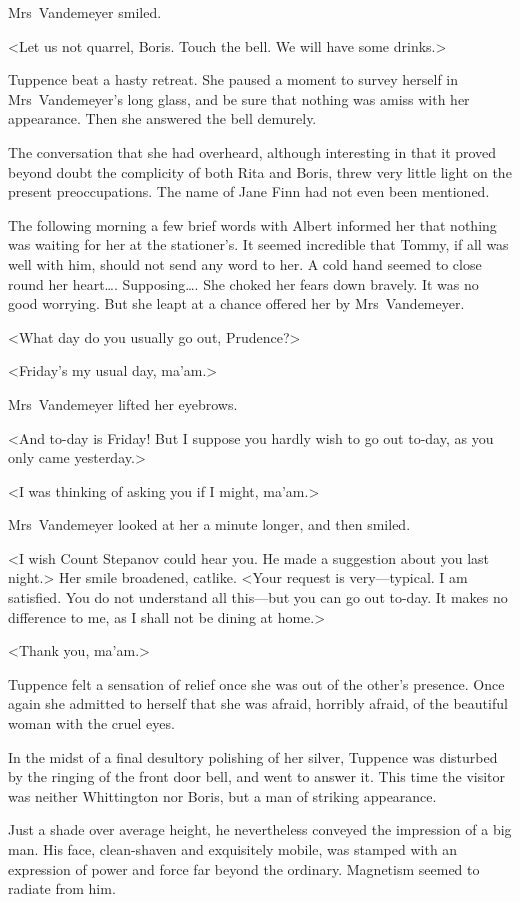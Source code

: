Mrs~Vandemeyer smiled.

<Let us not quarrel, Boris. Touch the bell. We will have some drinks.>

Tuppence beat a hasty retreat. She paused a moment to survey herself in Mrs~Vandemeyer's long glass, and be sure that nothing was amiss with her appearance. Then she answered the bell demurely.

The conversation that she had overheard, although interesting in that it proved beyond doubt the complicity of both Rita and Boris, threw very little light on the present preoccupations. The name of Jane Finn had not even been mentioned.

The following morning a few brief words with Albert informed her that nothing was waiting for her at the stationer's. It seemed incredible that Tommy, if all was well with him, should not send any word to her. A cold hand seemed to close round her heart\dots. Supposing\dots. She choked her fears down bravely. It was no good worrying. But she leapt at a chance offered her by Mrs~Vandemeyer.

<What day do you usually go out, Prudence?>

<Friday's my usual day, ma'am.>

Mrs~Vandemeyer lifted her eyebrows.

<And to-day is Friday! But I suppose you hardly wish to go out to-day, as you only came yesterday.>

<I was thinking of asking you if I might, ma'am.>

Mrs~Vandemeyer looked at her a minute longer, and then smiled.

<I wish Count Stepanov could hear you. He made a suggestion about you last night.> Her smile broadened, catlike. <Your request is very—typical. I am satisfied. You do not understand all this—but you can go out to-day. It makes no difference to me, as I shall not be dining at home.>

<Thank you, ma'am.>

Tuppence felt a sensation of relief once she was out of the other's presence. Once again she admitted to herself that she was afraid, horribly afraid, of the beautiful woman with the cruel eyes.

In the midst of a final desultory polishing of her silver, Tuppence was disturbed by the ringing of the front door bell, and went to answer it. This time the visitor was neither Whittington nor Boris, but a man of striking appearance.

Just a shade over average height, he nevertheless conveyed the impression of a big man. His face, clean-shaven and exquisitely mobile, was stamped with an expression of power and force far beyond the ordinary. Magnetism seemed to radiate from him.

